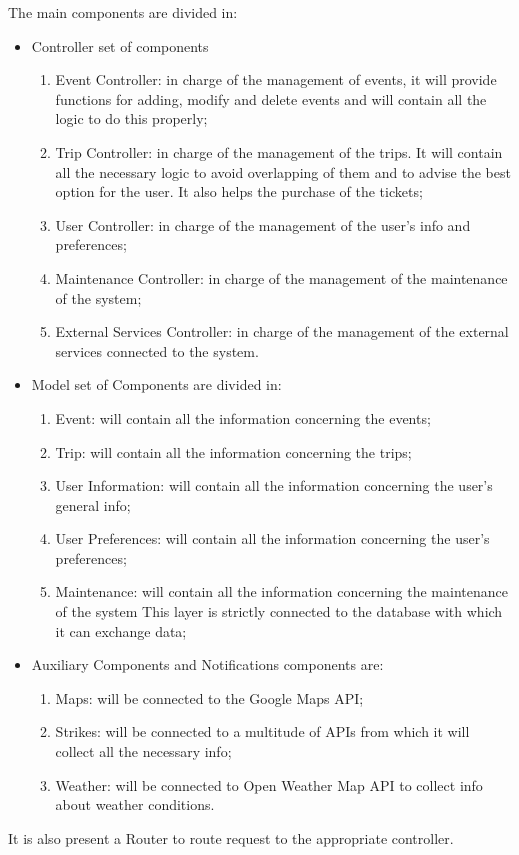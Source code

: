 The main components are divided in:
\begin{itemize}

\item	Controller set of components
\begin{enumerate}
\item	Event Controller: in charge of the management of events, it will provide functions for adding, modify and delete events and will contain all the logic to do this properly;
\item	Trip Controller: in charge of the management of the trips. It will contain all the necessary logic to avoid overlapping of them and to advise the best option for the user. It also helps the purchase of the tickets;
\item	User Controller: in charge of the management of the user’s info and preferences;
\item	Maintenance Controller: in charge of the management of the maintenance of the system;
\item	External Services Controller: in charge of the management of the external services connected to the system.
\end{enumerate}
\item	Model set of Components are divided in:
\begin{enumerate}

\item	Event: will contain all the information concerning the events;
\item	Trip: will contain all the information concerning the trips;
\item	User Information: will contain all the information concerning the user’s general info;
\item	User Preferences: will contain all the information concerning the user’s preferences;
\item	Maintenance: will contain all the information concerning the maintenance of the system
This layer is strictly connected to the database with which it can exchange data;
\end{enumerate}

\item	Auxiliary Components and Notifications components are:
\begin{enumerate}
\item	Maps: will be connected to the Google Maps API;
\item	Strikes: will be connected to a multitude of APIs from which it will collect all the necessary info;
\item	Weather: will be connected to Open Weather Map API to collect info about weather conditions.
\end{enumerate}
\end{itemize}
It is also present a Router to route request to the appropriate controller.

